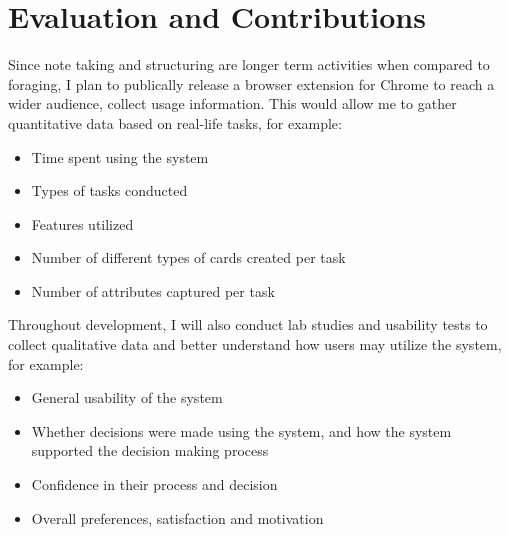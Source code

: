 \section{Evaluation and Contributions}


Since note taking and structuring are longer term activities when compared to foraging, I plan to publically release a browser extension for Chrome to reach a wider audience, collect usage information. This would allow me to gather quantitative data based on real-life tasks, for example: 

\begin{itemize}
    \item Time spent using the system
    \item Types of tasks conducted
    \item Features utilized
    \item Number of different types of cards created per task
    \item Number of attributes captured per task
\end{itemize}

Throughout development, I will also conduct lab studies and usability tests to collect qualitative data and better understand how users may utilize the system, for example:

\begin{itemize}
    \item General usability of the system
    \item Whether decisions were made using the system, and how the system supported the decision making process
    \item Confidence in their process and decision
    \item Overall preferences, satisfaction and motivation
\end{itemize}

